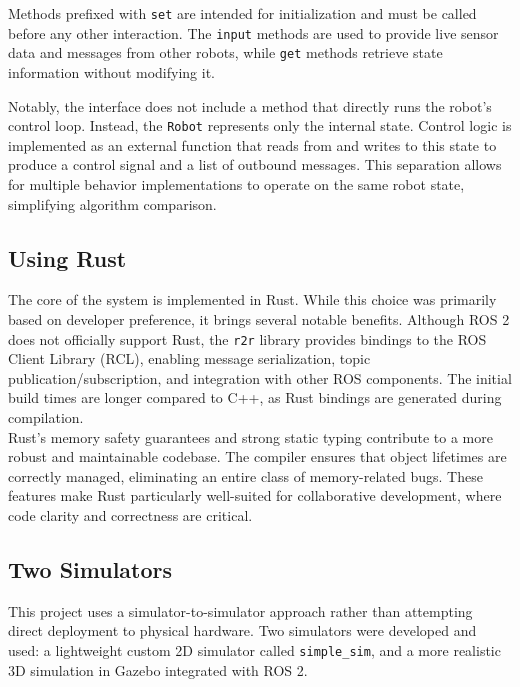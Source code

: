 Methods prefixed with \texttt{set} are intended for initialization and must be called before any other interaction. The \texttt{input} methods are used to provide live sensor data and messages from other robots, while \texttt{get} methods retrieve state information without modifying it.

Notably, the interface does not include a method that directly runs the robot’s control loop. Instead, the \texttt{Robot} represents only the internal state. Control logic is implemented as an external function that reads from and writes to this state to produce a control signal and a list of outbound messages. This separation allows for multiple behavior implementations to operate on the same robot state, simplifying algorithm comparison.

\subsection{Using Rust}
The core of the system is implemented in Rust. While this choice was primarily based on developer preference, it brings several notable benefits. Although ROS 2 does not officially support Rust, the \texttt{r2r} library \cite{r2r} provides bindings to the ROS Client Library (RCL), enabling message serialization, topic publication/subscription, and integration with other ROS components. The initial build times are longer compared to C++, as Rust bindings are generated during compilation.\\


Rust's memory safety guarantees and strong static typing contribute to a more robust and maintainable codebase. The compiler ensures that object lifetimes are correctly managed, eliminating an entire class of memory-related bugs. These features make Rust particularly well-suited for collaborative development, where code clarity and correctness are critical.

\subsection{Two Simulators}
This project uses a simulator-to-simulator approach rather than attempting direct deployment to physical hardware. Two simulators were developed and used: a lightweight custom 2D simulator called \texttt{simple\_sim}, and a more realistic 3D simulation in Gazebo integrated with ROS 2.

